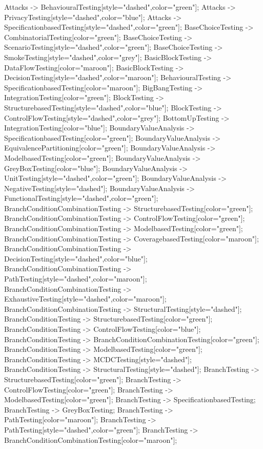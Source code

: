 \documentclass{article}
\begin{document}
{Attacks -> BehaviouralTesting[style="dashed",color="green"];
Attacks -> PrivacyTesting[style="dashed",color="blue"];
Attacks -> SpecificationbasedTesting[style="dashed",color="green"];
BaseChoiceTesting -> CombinatorialTesting[color="green"];
BaseChoiceTesting -> ScenarioTesting[style="dashed",color="green"];
BaseChoiceTesting -> SmokeTesting[style="dashed",color="grey"];
BasicBlockTesting -> DataFlowTesting[color="maroon"];
BasicBlockTesting -> DecisionTesting[style="dashed",color="maroon"];
BehaviouralTesting -> SpecificationbasedTesting[color="maroon"];
BigBangTesting -> IntegrationTesting[color="green"];
BlockTesting -> StructurebasedTesting[style="dashed",color="blue"];
BlockTesting -> ControlFlowTesting[style="dashed",color="grey"];
BottomUpTesting -> IntegrationTesting[color="blue"];
BoundaryValueAnalysis -> SpecificationbasedTesting[color="green"];
BoundaryValueAnalysis -> EquivalencePartitioning[color="green"];
BoundaryValueAnalysis -> ModelbasedTesting[color="green"];
BoundaryValueAnalysis -> GreyBoxTesting[color="blue"];
BoundaryValueAnalysis -> UnitTesting[style="dashed",color="green"];
BoundaryValueAnalysis -> NegativeTesting[style="dashed"];
BoundaryValueAnalysis -> FunctionalTesting[style="dashed",color="green"];
BranchConditionCombinationTesting -> StructurebasedTesting[color="green"];
BranchConditionCombinationTesting -> ControlFlowTesting[color="green"];
BranchConditionCombinationTesting -> ModelbasedTesting[color="green"];
BranchConditionCombinationTesting -> CoveragebasedTesting[color="maroon"];
BranchConditionCombinationTesting -> DecisionTesting[style="dashed",color="blue"];
BranchConditionCombinationTesting -> PathTesting[style="dashed",color="maroon"];
BranchConditionCombinationTesting -> ExhaustiveTesting[style="dashed",color="maroon"];
BranchConditionCombinationTesting -> StructuralTesting[style="dashed"];
BranchConditionTesting -> StructurebasedTesting[color="green"];
BranchConditionTesting -> ControlFlowTesting[color="blue"];
BranchConditionTesting -> BranchConditionCombinationTesting[color="green"];
BranchConditionTesting -> ModelbasedTesting[color="green"];
BranchConditionTesting -> MCDCTesting[style="dashed"];
BranchConditionTesting -> StructuralTesting[style="dashed"];
BranchTesting -> StructurebasedTesting[color="green"];
BranchTesting -> ControlFlowTesting[color="green"];
BranchTesting -> ModelbasedTesting[color="green"];
BranchTesting -> SpecificationbasedTesting;
BranchTesting -> GreyBoxTesting;
BranchTesting -> PathTesting[color="maroon"];
BranchTesting -> PathTesting[style="dashed",color="green"];
BranchTesting -> BranchConditionCombinationTesting[color="maroon"];
}
\end{document}
